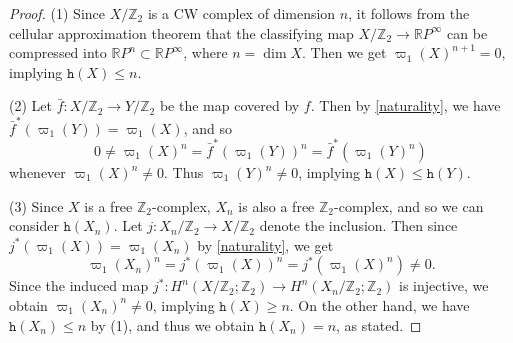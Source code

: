 \documentclass[amsfonts]{amsart}
\numberwithin{equation}{section}
\theoremstyle{definition}
\theoremstyle{remark}
\newcommand{\Z}{\mathbb{Z}}
\newcommand{\R}{\mathbb{R}}
\newcommand{\h}{\mathtt{h}}
\begin{document}
  \begin{proof}
    (1) Since $X/\Z_2$ is a CW complex of dimension $n$, it follows from the cellular approximation theorem that the classifying map $X/\Z_2\to\R P^\infty$ can be compressed into $\R P^n\subset\R P^\infty$, where $n=\dim X$. Then we get $\varpi_1(X)^{n+1}=0$, implying $\h(X)\le n$.



    \noindent(2) Let $\bar{f}\colon X/\Z_2\to Y/\Z_2$ be the map covered by $f$. Then by \eqref{naturality}, we have $\bar{f}^*(\varpi_1(Y))=\varpi_1(X)$, and so
    \[
      0\ne \varpi_1(X)^n=\bar{f}^*(\varpi_1(Y))^n=\bar{f}^*(\varpi_1(Y)^n)
    \]
    whenever $\varpi_1(X)^n\ne 0$. Thus $\varpi_1(Y)^n\ne 0$, implying $\h(X)\le\h(Y)$.



    \noindent(3) Since $X$ is a free $\Z_2$-complex, $X_n$ is also a free $\Z_2$-complex, and so we can consider $\h(X_n)$. Let $j\colon X_n/\Z_2\to X/\Z_2$ denote the inclusion. Then since $j^*(\varpi_1(X))=\varpi_1(X_n)$ by \eqref{naturality}, we get
    \[
      \varpi_1(X_n)^n=j^*(\varpi_1(X))^n=j^*(\varpi_1(X)^n)\ne 0.
    \]
    Since the induced map $j^*\colon H^n(X/\Z_2;\Z_2)\to H^n(X_n/\Z_2;\Z_2)$ is injective, we obtain $\varpi_1(X_n)^n\ne 0$, implying $\h(X)\ge n$. On the other hand, we have $\h(X_n)\le n$ by (1), and thus we obtain $\h(X_n)=n$, as stated.
  \end{proof}
\end{document}
